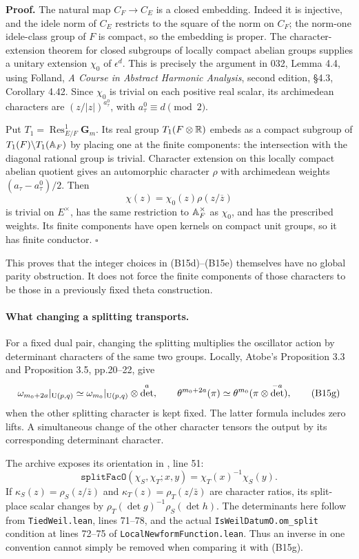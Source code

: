 \documentclass[11pt]{article}
\theoremstyle{definition}\newtheorem{definition}[theorem]{Definition}\newtheorem{remark}[theorem]{Remark}
\begin{document}
\textbf{Proof.}
The natural map $C_F\to C_E$ is a closed embedding. Indeed it is injective, and the idele norm of $C_E$ restricts to the square of the norm on $C_F$; the norm-one idele-class group of $F$ is compact, so the embedding is proper. The character-extension theorem for closed subgroups of locally compact abelian groups supplies a unitary extension $\chi_0$ of $\epsilon^d$. This is precisely the argument in 032, Lemma 4.4, using Folland, \emph{A Course in Abstract Harmonic Analysis}, second edition, \S4.3, Corollary 4.42. Since $\chi_0$ is trivial on each positive real scalar, its archimedean characters are $(z/|z|)^{a^0_\tau}$, with $a^0_\tau\equiv d\pmod2$.

Put $T_1=\operatorname{Res}^{1}_{E/F}\mathbf G_m$. Its real group $T_1(F\otimes\mathbb R)$ embeds as a compact subgroup of $T_1(F)\backslash T_1(\mathbb A_F)$ by placing one at the finite components: the intersection with the diagonal rational group is trivial. Character extension on this locally compact abelian quotient gives an automorphic character $\rho$ with archimedean weights $(a_\tau-a^0_\tau)/2$. Then
\[
 \chi(z)=\chi_0(z)\rho(z/\overline z)
\]
is trivial on $E^\times$, has the same restriction to $\mathbb A_F^\times$ as $\chi_0$, and has the prescribed weights. Its finite components have open kernels on compact unit groups, so it has finite conductor. \hfill$\square$

This proves that the integer choices in (B15d)--(B15e) themselves have no global parity obstruction. It does not force the finite components of those characters to be those in a previously fixed theta construction.

\paragraph{What changing a splitting transports.}
For a fixed dual pair, changing the splitting multiplies the oscillator action by determinant characters of the same two groups. Locally, Atobe's Proposition 3.3 and Proposition 3.5, pp.20--22, give
\[
 \omega_{m_0+2a}|_{\operatorname{U}(p,q)}
       \simeq\omega_{m_0}|_{\operatorname{U}(p,q)}\otimes\det^a,
 \qquad
 \theta^{m_0+2a}(\pi)
       \simeq\theta^{m_0}(\pi\otimes\det^{-a}),
 \tag{B15g}
\]
when the other splitting character is kept fixed. The latter formula includes zero lifts. A simultaneous change of the other character tensors the output by its corresponding determinant character.

The archive exposes its orientation in
, line 51:
\[
 \texttt{splitFacO}(\chi_S,\chi_T;x,y)=\chi_T(x)^{-1}\chi_S(y).
 \tag{B15h}
\]
If $\kappa_S(z)=\rho_S(z/\bar z)$ and $\kappa_T(z)=\rho_T(z/\bar z)$ are character ratios, its split-place scalar changes by
$\rho_T(\det g)^{-1}\rho_S(\det h)$.
The determinants here follow from \texttt{TiedWeil.lean}, lines 71--78, and the actual \texttt{IsWeilDatumO.om\_split} condition at lines 72--75 of \texttt{LocalNewformFunction.lean}. Thus an inverse in one convention cannot simply be removed when comparing it with (B15g).
\end{document}
